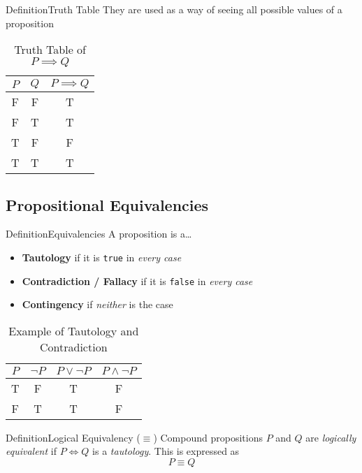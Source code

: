 \documentclass{MathNotes}
\newenvironment{definition}[1]{\begin{RedBox}{Definition}{#1}}{\end{RedBox}}
\begin{document}
\begin{definition}{Truth Table}
	They are used as a way of seeing all possible values of a proposition
\end{definition}

\begin{table}[h!]\label{tab:truth-table-example}
	\centering
	\caption{Truth Table of $P\implies Q$}
	\begin{tabular}{cc|c}
		$P$ & $Q$ & $P\implies Q$ \\
		\hline
		F   & F   & T             \\
		F   & T   & T             \\
		T   & F   & F             \\
		T   & T   & T             \\
	\end{tabular}
\end{table}

\subsection{Propositional Equivalencies}\label{sec:prop-equivalencies}
\begin{definition}{Equivalencies}\label{def:equivalencies}
	A proposition is a\ldots
	\begin{itemize}
		\item \textbf{Tautology} if it is \texttt{true} in \textit{every case}
		\item \textbf{Contradiction / Fallacy} if it is \texttt{false} in \textit{every case}
		\item \textbf{Contingency} if \textit{neither} is the case
	\end{itemize}
\end{definition}

\begin{table}[h!]\label{tab:tautology-contradiciton-ex}
	\centering
	\caption{Example of Tautology and Contradiction}
	\begin{tabular}{c|c|c|c}
		$P$ & $\lnot P$ & $P\lor\lnot P$ & $P\land\lnot P$ \\
		\hline
		T   & F         & T              & F               \\
		F   & T         & T              & F
	\end{tabular}
\end{table}

\begin{definition}{Logical Equivalency ($\equiv$)}\label{th:logical-equiv}
	Compound propositions $P$ and $Q$ are \textit{logically equivalent} if $P\iff Q$ is a \textit{tautology}. This is expressed as \[P\equiv Q\]
\end{definition}
\end{document}
